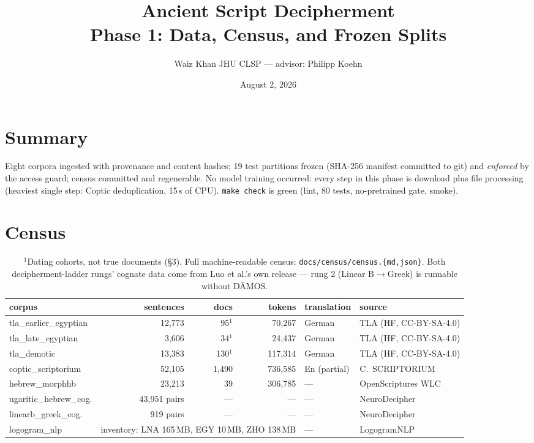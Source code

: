\documentclass[11pt]{article}
\title{\Large Ancient Script Decipherment\\
\large Phase 1: Data, Census, and Frozen Splits}
\author{Waiz Khan \quad \small JHU CLSP --- advisor: Philipp Koehn}
\date{August 2, 2026 \quad {\small stamp: \ReportStamp}}
\begin{document}
\maketitle

\section{Summary}
Eight corpora ingested with provenance and content hashes; 19 test partitions
frozen (SHA-256 manifest committed to git) and \emph{enforced} by the access
guard; census committed and regenerable. No model training occurred: every
step in this phase is download plus file processing (heaviest single step:
Coptic deduplication, 15\,s of CPU). \texttt{make check} is green (lint, 80
tests, no-pretrained gate, smoke).

\section{Census}
\begin{table}[h]\centering\scriptsize
\setlength{\tabcolsep}{3pt}
\begin{tabular}{lrrrll}
\toprule
corpus & sentences & docs & tokens & translation & source \\
\midrule
tla\_earlier\_egyptian & 12{,}773 & 95$^{1}$ & 70{,}267 & German & TLA (HF, CC-BY-SA-4.0) \\
tla\_late\_egyptian    & 3{,}606  & 34$^{1}$ & 24{,}437 & German & TLA (HF, CC-BY-SA-4.0) \\
tla\_demotic           & 13{,}383 & 130$^{1}$& 117{,}314& German & TLA (HF, CC-BY-SA-4.0) \\
coptic\_scriptorium    & 52{,}105 & 1{,}490  & 736{,}585& En (partial) & C.\ SCRIPTORIUM \\
hebrew\_morphhb        & 23{,}213 & 39       & 306{,}785& ---    & OpenScriptures WLC \\
ugaritic\_hebrew\_cog. & 43{,}951 pairs & --- & ---     & ---    & NeuroDecipher \\
linearb\_greek\_cog.   & 919 pairs & ---     & ---      & ---    & NeuroDecipher \\
logogram\_nlp          & \multicolumn{3}{l}{inventory: LNA 165\,MB, EGY 10\,MB, ZHO 138\,MB} & --- & LogogramNLP \\
\bottomrule
\end{tabular}
\caption{$^{1}$Dating cohorts, not true documents (\S3). Full machine-readable
census: \texttt{docs/census/census.\{md,json\}}. Both decipherment-ladder
rungs' cognate data come from Luo et al.'s own release --- rung 2 (Linear
B$\to$Greek) is runnable without D\=AMOS.}
\end{table}
\end{document}
